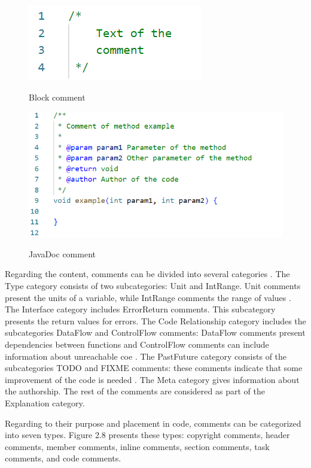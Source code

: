 \begin{figure} [H]
  \centering
  \includegraphics [scale=1]
  {figures/multiline.png}
  \caption{Block comment}
  \cite{de2011comment}
  \label{fig:AnhangsChor}
\end{figure}

\begin{figure} [H]
  \centering
  \includegraphics [scale=0.9]
  {figures/javad.png}
  \caption{JavaDoc comment}
  \cite{de2011comment}
  \label{fig:AnhangsChor}
\end{figure}

Regarding the content, comments can be divided into several categories \cite{de2011comment}. The Type category consists of two subcategories: Unit and IntRange. Unit comments present the units of a variable, while IntRange comments the range of values \cite{de2011comment}.
The Interface category includes ErrorReturn comments. This subcategory presents the return values for errors. 
The Code Relationship category includes the subcategories DataFlow and ControlFlow comments: DataFlow comments present dependencies between functions and ControlFlow comments can include information about unreachable coe \cite{de2011comment}.
The PastFuture category consists of the subcategories TODO and FIXME comments: these comments indicate that some improvement of the code is needed \cite{de2011comment}.
The Meta category gives information about the authorship. The rest of the comments are considered as part of the Explanation category.


Regarding to their purpose and placement in code, comments can be categorized into seven types.  Figure 2.8 presents these types: copyright comments, header comments, member comments, inline comments, section comments, task comments, and code comments. 

